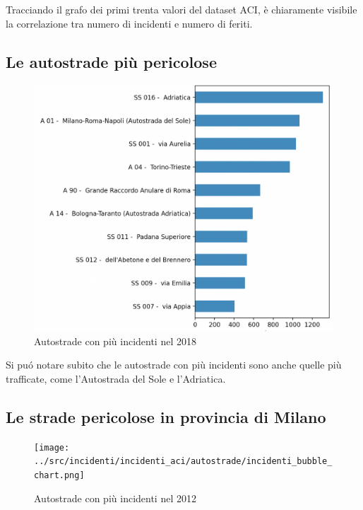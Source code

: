 \documentclass[a4paper]{report}
\begin{document}
Tracciando il grafo dei primi trenta valori del dataset ACI, 
è chiaramente visibile la correlazione tra numero di incidenti e numero di feriti.



\subsection{Le autostrade più pericolose}
\begin{figure}
    \includegraphics[width=\linewidth]{../src/incidenti/incidenti_aci/autostrade/autostrade.png}
    \caption{Autostrade con più incidenti nel 2018}
    \label{fig:incidenti_autostrade}
\end{figure}

Si pu\'o notare subito che le autostrade con più incidenti sono anche quelle più trafficate, come 
l'Autostrada del Sole e l'Adriatica.




\subsection{Le strade pericolose in provincia di Milano}

\begin{figure}
    \texttt{[image: ../src/incidenti/incidenti\_aci/autostrade/incidenti\_bubble\_chart.png]}
    \caption{Autostrade con più incidenti nel 2012}
    \label{fig:bubble_incidenti_milano}
\end{figure}
\end{document}
